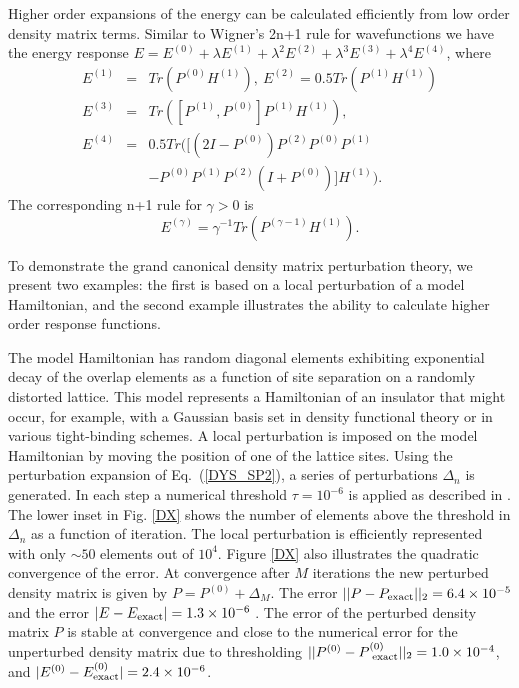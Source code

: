 Higher order expansions of the energy can be calculated efficiently from low
order density matrix terms. Similar to Wigner's 2n+1 rule for
wavefunctions \cite{Helgaker} we have the energy response 
${E} = E^{(0)} + \lambda E^{(1)} + \lambda^2 E^{(2)} + \lambda^3 E^{(3)} 
+ \lambda^4 E^{(4)}$, where
\begin{eqnarray}\label{Tnp1}
E^{(1)} &=& Tr(P^{(0)} H^{(1)}), ~ E^{(2)} = 0.5 Tr(P^{(1)} H^{(1)}) \nonumber \\
E^{(3)} &=& Tr([P^{(1)},P^{(0)}] P^{(1)} H^{(1)}), \\
E^{(4)} &=& 0.5 Tr([(2I-P^{(0)}) P^{(2)} P^{(0)} P^{(1)} \nonumber \\
&~& - P^{(0)} P^{(1)} P^{(2)} (I+P^{(0)})] H^{(1)}). \nonumber
\end{eqnarray}
The corresponding n+1 rule for $\gamma > 0$ is 
\begin{equation}\label{Onp1}
E^{(\gamma)} = \gamma^{-1} Tr(P^{(\gamma-1)}H^{(1)}).
\end{equation}

To demonstrate the grand canonical density matrix
perturbation theory, we present two examples: the first is based  
on a local perturbation of a model Hamiltonian, and the second
example illustrates the ability to calculate higher order
response functions.

The model Hamiltonian has random
diagonal elements exhibiting exponential decay of the overlap elements 
as a function of site separation on a randomly distorted 
lattice. This model represents a Hamiltonian of an insulator
that might occur, for example, with a Gaussian basis set in 
density functional theory or in various tight-binding schemes. 
A local perturbation is imposed on the model Hamiltonian
by moving the position of one of the lattice sites.
Using the perturbation expansion of Eq.\ (\ref{DYS_SP2}),
a series of perturbations $\Delta_n$ is generated. In each 
step a numerical threshold $\tau = 10^{-6}$ is applied as described in
\cite{NiklassonSP4}.  The lower inset in Fig.  \ref{DX} shows 
the number of elements above the threshold in $\Delta_n$ 
as a function of iteration. The local perturbation
is efficiently represented with only $\sim 50$ elements out of $10^4$.
Figure \ref{DX} also illustrates the quadratic convergence
of the error.  At convergence after 
$M$ iterations the new perturbed density matrix is given by
${P} = P^{(0)} + \Delta_M$. The error 
$||{P} - P_{\rm exact}||_2 = 6.4 \times 10^{-5}$
and the error $|{E} - E_{\rm exact}| = 1.3 \times 10^{-6}$
\cite{first_order}.  The error of the perturbed density matrix 
${P}$ is stable at convergence and close to the numerical error 
for the unperturbed density matrix due to thresholding
$||P^{(0)} - P^{(0)}_{\rm ~exact}||_2 = 1.0 \times 10^{-4}$, and
$|{E}^{(0)} - E^{(0)}_{\rm exact}| = 2.4 \times 10^{-6}$.

